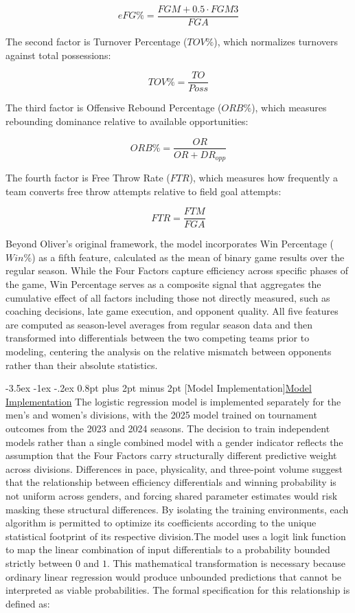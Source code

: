 \documentclass[12pt,leqno]{article}\usepackage[pdftex]{graphicx}\usepackage[dvipsnames]{xcolor}
\makeatletter
\renewcommand\subsubsection{\@startsection {subsubsection}{1}{\z@}%
{-3.5ex \@plus -1ex \@minus -.2ex}%
{0.8pt plus 2pt minus 2pt}%
{\normalfont}}
\newcommand{\usubsubsection}[1]{\subsubsection[#1]{\normalfont\normalfont\underline{#1}}}%
\theoremstyle{remark}
\makeatother
\begin{document}
\begin{equation}eFG\% = \frac{FGM + 0.5 \cdot FGM3}{FGA}\end{equation}

The second factor is Turnover Percentage ($TOV\%$), which normalizes turnovers against total possessions:

\begin{equation}TOV\% = \frac{TO}{Poss}\end{equation}

The third factor is Offensive Rebound Percentage ($ORB\%$), which measures rebounding dominance relative to available opportunities:

\begin{equation}ORB\% = \frac{OR}{OR + DR_{opp}}\end{equation}

The fourth factor is Free Throw Rate ($FTR$), which measures how frequently a team converts free throw attempts relative to field goal attempts:

\begin{equation}FTR = \frac{FTM}{FGA}\end{equation}

Beyond Oliver's original framework, the model incorporates Win Percentage ($Win\%$) as a fifth feature, calculated as the mean of binary game results over the regular season. While the Four Factors capture efficiency across specific phases of the game, Win Percentage serves as a composite signal that aggregates the cumulative effect of all factors including those not directly measured, such as coaching decisions, late game execution, and opponent quality. All five features are computed as season-level averages from regular season data and then transformed into differentials between the two competing teams prior to modeling, centering the analysis on the relative mismatch between opponents rather than their absolute statistics.

\usubsubsection{Model Implementation}
The logistic regression model is implemented separately for the men's and women's divisions, with the 2025 model trained on tournament outcomes from the 2023 and 2024 seasons. The decision to train independent models rather than a single combined model with a gender indicator reflects the assumption that the Four Factors carry structurally different predictive weight across divisions. Differences in pace, physicality, and three-point volume suggest that the relationship between efficiency differentials and winning probability is not uniform across genders, and forcing shared parameter estimates would risk masking these structural differences. By isolating the training environments, each algorithm is permitted to optimize its coefficients according to the unique statistical footprint of its respective division.The model uses a logit link function to map the linear combination of input differentials to a probability bounded strictly between $0$ and $1$. This mathematical transformation is necessary because ordinary linear regression would produce unbounded predictions that cannot be interpreted as viable probabilities. The formal specification for this relationship is defined as:
\end{document}
